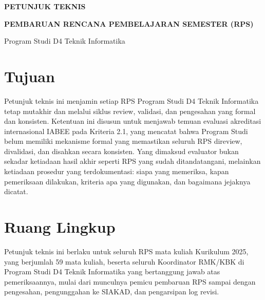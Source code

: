 \documentclass[12pt,a4paper]{report}
\begin{document}
\begin{center}
  {\bfseries\fontsize{14pt}{17pt}\selectfont PETUNJUK TEKNIS\par}
  \vspace{2pt}
  {\bfseries\fontsize{14pt}{17pt}\selectfont PEMBARUAN RENCANA PEMBELAJARAN SEMESTER (RPS)\par}
  \vspace{2pt}
  {\fontsize{11pt}{13pt}\selectfont Program Studi D4 Teknik Informatika\par}
\end{center}

\vspace{0.6cm}

\section{Tujuan}

Petunjuk teknis ini menjamin setiap RPS Program Studi D4 Teknik Informatika tetap mutakhir dan melalui siklus review, validasi, dan pengesahan yang formal dan konsisten. Ketentuan ini disusun untuk menjawab temuan evaluasi akreditasi internasional IABEE pada Kriteria 2.1, yang mencatat bahwa Program Studi belum memiliki mekanisme formal yang memastikan seluruh RPS direview, divalidasi, dan disahkan secara konsisten. Yang dimaksud evaluator bukan sekadar ketiadaan hasil akhir seperti RPS yang sudah ditandatangani, melainkan ketiadaan prosedur yang terdokumentasi: siapa yang memeriksa, kapan pemeriksaan dilakukan, kriteria apa yang digunakan, dan bagaimana jejaknya dicatat.

\section{Ruang Lingkup}

Petunjuk teknis ini berlaku untuk seluruh RPS mata kuliah Kurikulum 2025, yang berjumlah 59 mata kuliah, beserta seluruh Koordinator RMK/KBK di Program Studi D4 Teknik Informatika yang bertanggung jawab atas pemeriksaannya, mulai dari munculnya pemicu pembaruan RPS sampai dengan pengesahan, pengunggahan ke SIAKAD, dan pengarsipan log revisi.
\end{document}

